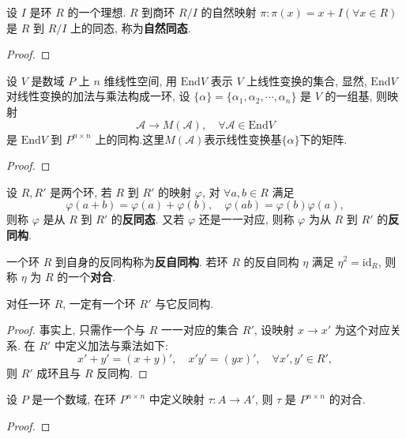 \documentclass[../../main.tex]{subfiles}
\begin{document}
\begin{example}
设 \( I \) 是环 \( R \) 的一个理想. \( R \) 到商环 \( R/I \) 的自然映射 \( \pi: \pi(x) = x + I (\forall x \in R) \) 是 \( R \) 到 \( R/I \) 上的同态, 称为\textbf{自然同态}.
\end{example}
\begin{proof}


\end{proof}

\begin{example}
设 \( V \) 是数域 \( P \) 上 \( n \) 维线性空间, 用 \( \text{End}V \) 表示 \( V \) 上线性变换的集合, 显然, \( \text{End}V \) 对线性变换的加法与乘法构成一环, 设 \( \{\alpha\} = \{\alpha_1, \alpha_2, \cdots, \alpha_n\} \) 是 \( V \) 的一组基, 则映射
\[
\mathcal{A} \to M(\mathcal{A}), \quad \forall \mathcal{A} \in \text{End}V
\]
是 \( \text{End}V \) 到 \( P^{n \times n} \) 上的同构.这里$M(\mathcal{A})$表示线性变换基$\{\alpha\}$下的矩阵.
\end{example}
\begin{proof}


\end{proof}

\begin{definition}
设 \( R, R' \) 是两个环, 若 \( R \) 到 \( R' \) 的映射 \( \varphi \), 对 \( \forall a,b \in R \) 满足
\[
\varphi(a + b) = \varphi(a) + \varphi(b), \quad \varphi(ab) = \varphi(b)\varphi(a),
\]
则称 \( \varphi \) 是从 \( R \) 到 \( R' \) 的\textbf{反同态}. 又若 \( \varphi \) 还是一一对应, 则称 \( \varphi \) 为从 \( R \) 到 \( R' \) 的\textbf{反同构}.

一个环 \( R \) 到自身的反同构称为\textbf{反自同构}. 若环 \( R \) 的反自同构 \( \eta \) 满足 \( \eta^2 = \text{id}_R \), 则称 \( \eta \) 为 \( R \) 的一个\textbf{对合}.
\end{definition}

\begin{theorem}
对任一环 \( R \), 一定有一个环 \( R' \) 与它反同构.
\end{theorem}
\begin{proof}
事实上, 只需作一个与 \( R \) 一一对应的集合 \( R' \), 设映射 \( x \to x' \) 为这个对应关系. 在 \( R' \) 中定义加法与乘法如下:
\[
x' + y' = (x + y)', \quad x'y' = (yx)', \quad \forall x', y' \in R',
\]
则 \( R' \) 成环且与 \( R \) 反同构.

\end{proof}

\begin{example}
设 \( P \) 是一个数域, 在环 \( P^{n \times n} \) 中定义映射 \( \tau: A \to A' \), 则 \( \tau \) 是 \( P^{n \times n} \) 的对合.
\end{example}
\begin{proof}


\end{proof}
\end{document}
